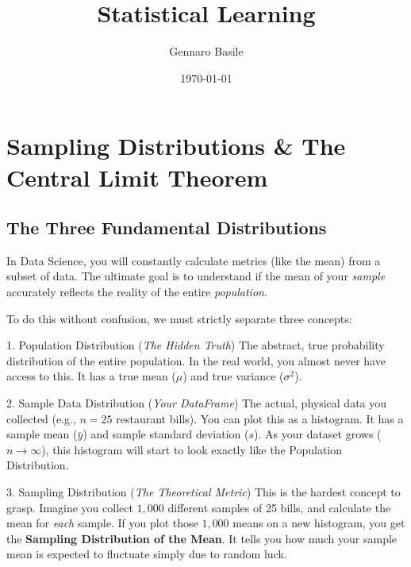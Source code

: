 \documentclass[11pt]{article}
\title{\Huge Statistical Learning}
\author{\Large Gennaro Basile}
\date{\today}
\theoremstyle{smallexample}
\begin{document}
\maketitle
{}
\captionsetup[figure]{labelfont=bf}

\pagebreak

\tableofcontents
\pagebreak



\section{Sampling Distributions \& The Central Limit Theorem}

\subsection{The Three Fundamental Distributions}
In Data Science, you will constantly calculate metrics (like the mean) from a subset of data. The ultimate goal is to understand if the mean of your \textit{sample} accurately reflects the reality of the entire \textit{population}. 

To do this without confusion, we must strictly separate three concepts:

\begin{defbox}{1. Population Distribution (\textit{The Hidden Truth})}
The abstract, true probability distribution of the entire population. In the real world, you almost never have access to this. It has a true mean ($\mu$) and true variance ($\sigma^2$).
\end{defbox}

\begin{defbox}{2. Sample Data Distribution (\textit{Your DataFrame})}
The actual, physical data you collected (e.g., $n=25$ restaurant bills). You can plot this as a histogram. It has a sample mean ($\bar{y}$) and sample standard deviation ($s$). As your dataset grows ($n \to \infty$), this histogram will start to look exactly like the Population Distribution.
\end{defbox}

\begin{defbox}{3. Sampling Distribution (\textit{The Theoretical Metric})}
This is the hardest concept to grasp. Imagine you collect $1,000$ different samples of 25 bills, and calculate the mean for \textit{each} sample. If you plot those $1,000$ means on a new histogram, you get the \textbf{Sampling Distribution of the Mean}. It tells you how much your sample mean is expected to fluctuate simply due to random luck.
\end{defbox}
\end{document}
